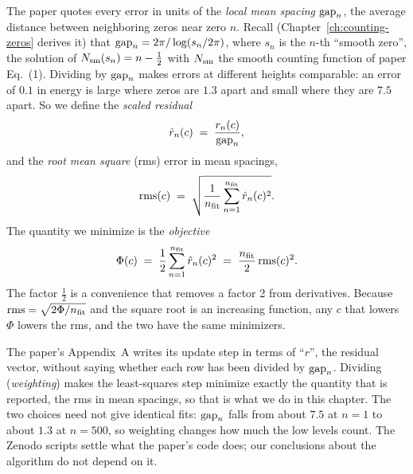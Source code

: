 The paper quotes every error in units of the \emph{local mean spacing} $\mathrm{gap}_n$, the average distance between neighboring zeros near zero $n$. Recall (Chapter~\ref{ch:counting-zeros} derives it) that $\mathrm{gap}_n=2\pi/\log(s_n/2\pi)$, where $s_n$ is the $n$-th ``smooth zero'', the solution of $N_{\mathrm{sm}}(s_n)=n-\tfrac12$ with $N_{\mathrm{sm}}$ the smooth counting function of paper Eq.~(1). Dividing by $\mathrm{gap}_n$ makes errors at different heights comparable: an error of $0.1$ in energy is large where zeros are $1.3$ apart and small where they are $7.5$ apart. So we define the \emph{scaled residual}
\begin{equation}
\hat r_n(c) \;=\; \frac{r_n(c)}{\mathrm{gap}_n},
\label{eq:fitting-scaled}
\end{equation}
and the \emph{root mean square} (rms) error in mean spacings,
\begin{equation}
\mathrm{rms}(c) \;=\; \sqrt{\frac{1}{n_{\rm fit}}\sum_{n=1}^{n_{\rm fit}}\hat r_n(c)^2 }.
\label{eq:fitting-rms}
\end{equation}
The quantity we minimize is the \emph{objective}
\begin{equation}
\Phi(c) \;=\; \frac12\sum_{n=1}^{n_{\rm fit}}\hat r_n(c)^2 \;=\; \frac{n_{\rm fit}}{2}\,\mathrm{rms}(c)^2 .
\label{eq:fitting-Phi}
\end{equation}
The factor $\tfrac12$ is a convenience that removes a factor 2 from derivatives. Because $\mathrm{rms}=\sqrt{2\Phi/n_{\rm fit}}$ and the square root is an increasing function, any $c$ that lowers $\Phi$ lowers the rms, and the two have the same minimizers.

\begin{pitfall}
The paper's Appendix~A writes its update step in terms of ``$r$'', the residual vector, without saying whether each row has been divided by $\mathrm{gap}_n$. Dividing (\emph{weighting}) makes the least-squares step minimize exactly the quantity that is reported, the rms in mean spacings, so that is what we do in this chapter. The two choices need not give identical fits: $\mathrm{gap}_n$ falls from about $7.5$ at $n=1$ to about $1.3$ at $n=500$, so weighting changes how much the low levels count. The Zenodo scripts \cite{zenodo} settle what the paper's code does; our conclusions about the algorithm do not depend on it.
\end{pitfall}

